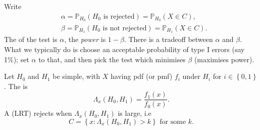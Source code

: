 \documentclass[egregdoesnotlikesansseriftitles,a4paper]{scrartcl}
\begin{document}
Write
\begin{align*}
     &\alpha =\mathbb{P}_{H_{0}}(H_0 \text{ is rejected} )=\mathbb{P}_{H_{0}} (X \in C),\\
     &\beta  =\mathbb{P}_{H_{1}}(H_0 \text{ is not rejected} )=\mathbb{P}_{H_{1}} (X \in C).
\end{align*} The  of the test is $\alpha $, the \emph{power} is $1-\beta $. There is a tradeoff between $\alpha $ and $\beta $. What we typically do is choose an acceptable probability of type I errors (say 1\%); set $\alpha $ to that, and then pick the test which minimises $\beta $ (maximises power).
\begin{definition*}
      Let $H_0 $ and $H_1 $ be simple, with $X$ having pdf (or pmf) $f_{i}$ under $H_{i}$ for $i \in \left\{0,1\right\}$. The  is \[
      \Lambda_{x} (H_0 ,H_1 )= \frac{f_1 (x)}{f_0 (x)}
      .\] A  (LRT) rejects when $\Lambda_{x} (H_0 ,H_1 )$ is large, i.e \[
      C= \left\{x: \Lambda_{x} (H_0 ,H_1 ) >k\right\} \text{ for some } k
      .\] 
\end{definition*}
\end{document}
